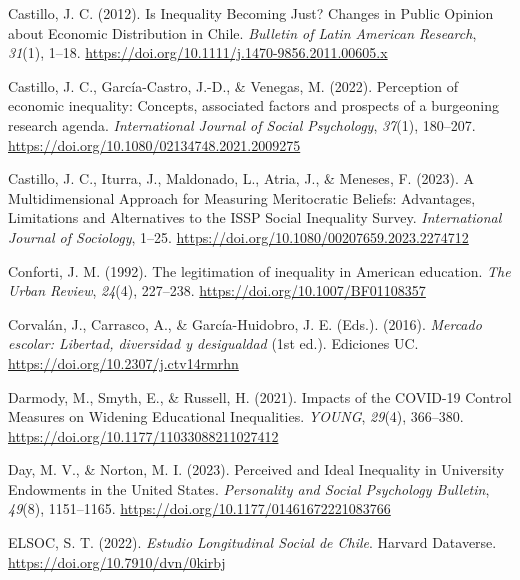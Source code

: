 \documentclass[
  12pt,
  a4paper,
]{article}
\newlength{\cslhangindent}
\newlength{\cslentryspacingunit} %
\newenvironment{CSLReferences}[2] %
 {%
  \setlength{\parindent}{0pt}
  \ifodd #1
  \let\oldpar\par
  \def\par{\hangindent=\cslhangindent\oldpar}
  \fi
  \setlength{\parskip}{#2\cslentryspacingunit}
 }%
 {}
\begin{document}
\begin{CSLReferences}{1}{0}
\leavevmode{}%
Castillo, J. C. (2012). Is {Inequality Becoming Just}? {Changes} in
{Public Opinion} about {Economic Distribution} in {Chile}.
\emph{Bulletin of Latin American Research}, \emph{31}(1), 1--18.
\url{https://doi.org/10.1111/j.1470-9856.2011.00605.x}

\leavevmode{}%
Castillo, J. C., García-Castro, J.-D., \& Venegas, M. (2022). Perception
of economic inequality: Concepts, associated factors and prospects of a
burgeoning research agenda. \emph{International Journal of Social
Psychology}, \emph{37}(1), 180--207.
\url{https://doi.org/10.1080/02134748.2021.2009275}

\leavevmode{}%
Castillo, J. C., Iturra, J., Maldonado, L., Atria, J., \& Meneses, F.
(2023). A {Multidimensional Approach} for {Measuring Meritocratic
Beliefs}: {Advantages}, {Limitations} and {Alternatives} to the {ISSP
Social Inequality Survey}. \emph{International Journal of Sociology},
1--25. \url{https://doi.org/10.1080/00207659.2023.2274712}

\leavevmode{}%
Conforti, J. M. (1992). The legitimation of inequality in {American}
education. \emph{The Urban Review}, \emph{24}(4), 227--238.
\url{https://doi.org/10.1007/BF01108357}

\leavevmode{}%
Corvalán, J., Carrasco, A., \& García-Huidobro, J. E. (Eds.). (2016).
\emph{Mercado escolar: {Libertad}, diversidad y desigualdad} (1st ed.).
Ediciones UC. \url{https://doi.org/10.2307/j.ctv14rmrhn}

\leavevmode{}%
Darmody, M., Smyth, E., \& Russell, H. (2021). Impacts of the {COVID-19
Control Measures} on {Widening Educational Inequalities}. \emph{YOUNG},
\emph{29}(4), 366--380. \url{https://doi.org/10.1177/11033088211027412}

\leavevmode{}%
Day, M. V., \& Norton, M. I. (2023). Perceived and {Ideal Inequality} in
{University Endowments} in the {United States}. \emph{Personality and
Social Psychology Bulletin}, \emph{49}(8), 1151--1165.
\url{https://doi.org/10.1177/01461672221083766}

\leavevmode{}%
ELSOC, S. T. (2022). \emph{Estudio {Longitudinal Social} de {Chile}}.
Harvard Dataverse. \url{https://doi.org/10.7910/dvn/0kirbj}


\end{CSLReferences}
\end{document}
